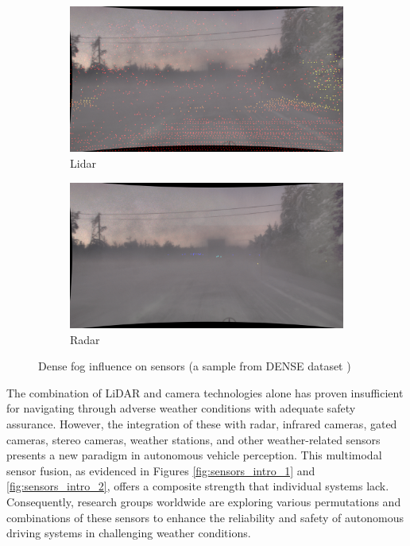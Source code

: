 \documentclass[report.tex]{subfiles}
\begin{document}
\begin{figure}[ht]
        \begin{subfigure}{.5\textwidth}
            \centering
            \includegraphics[width=.9\linewidth]{images/adverse_weather_influence_on_sensor/lidar_1.png}
            \caption{Lidar}
            \label{fig:sub3}
        \end{subfigure}%
        \begin{subfigure}{.5\textwidth}
            \centering
            \includegraphics[width=.9\linewidth]{images/adverse_weather_influence_on_sensor/radar_1.png}
            \caption{Radar}
            \label{fig:sub4}
        \end{subfigure}
        
        \caption{\centering Dense fog influence on sensors (a sample from DENSE dataset \cite{bijelic2020seeing}) }
        \label{fig:adverse_weather_influence_on_sensor}
    \end{figure}
    
    The combination of LiDAR and camera technologies alone has proven insufficient for navigating through adverse weather conditions with adequate safety assurance. However, the integration of these with radar, infrared cameras, gated cameras, stereo cameras, weather stations, and other weather-related sensors presents a new paradigm in autonomous vehicle perception. This multimodal sensor fusion, as evidenced in Figures \ref{fig:sensors_intro_1} and \ref{fig:sensors_intro_2}, offers a composite strength that individual systems lack. Consequently, research groups worldwide are exploring various permutations and combinations of these sensors to enhance the reliability and safety of autonomous driving systems in challenging weather conditions.
\end{document}
